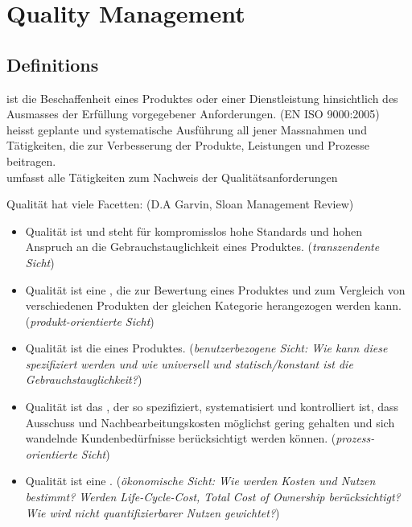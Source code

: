 \chapter{Quality Management}
\section{Definitions}
 ist die Beschaffenheit eines Produktes oder
einer Dienstleistung
hinsichtlich des Ausmasses der Erf\"ullung vorgegebener Anforderungen.
(EN ISO 9000:2005)\\[2ex] %
%
 heisst geplante und
systematische Ausf\"uhrung all
jener Massnahmen und T\"atigkeiten, die zur Verbes\-serung der Produkte,
Leistungen und Prozesse beitragen.\\[2ex]
%
  umfasst alle Tätigkeiten zum Nachweis der
  Qualitätsanforderungen \\[2ex] %
\ifslides
\newpage
\fi

Qualität hat viele Facetten: (D.A Garvin, Sloan Management Review)
\begin{itemize}
\item Qualität ist  und steht für
  kompromisslos hohe Standards und hohen Anspruch an die Gebrauchstauglichkeit
  eines Produktes. ({\em transzendente Sicht})
\item Qualität ist eine , die zur
  Bewertung eines Produktes und zum Vergleich von verschiedenen Produkten der
  gleichen Kategorie herangezogen werden kann. ({\em produkt-orientierte
  Sicht})
\item Qualität ist die  eines Produktes.
({\em benutzerbezogene Sicht: Wie kann diese
  spezifiziert werden und wie universell und statisch/konstant ist die
  Gebrauchstauglichkeit?})
\ifslides
\newpage
\fi
\item Qualität ist das , der so
  spezifiziert, systematisiert und kontrolliert ist, dass Ausschuss und
  Nachbearbeitungskosten möglichst gering gehalten und sich wandelnde
  Kundenbedürfnisse berücksichtigt werden können. ({\em prozess-orientierte
  Sicht})
\item Qualität ist eine .
({\em ökonomische Sicht: Wie werden Kosten und Nutzen bestimmt? Werden Life-Cycle-Cost,
  Total Cost of Ownership berücksichtigt? Wie wird nicht quantifizierbarer
  Nutzen gewichtet?})
\end{itemize}
\newpage

